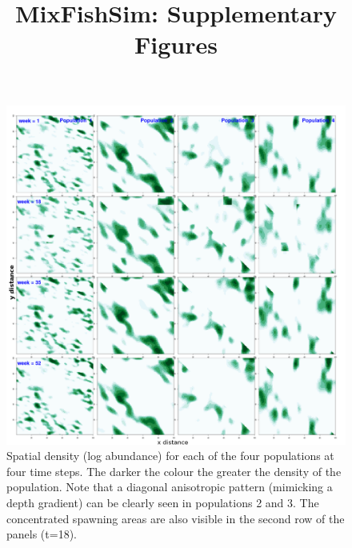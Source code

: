 \documentclass[review]{elsarticle}
\title{MixFishSim: Supplementary Figures}
\newcommand{\beginsupplement}{%
		        \setcounter{table}{0}
		        \renewcommand{\thetable}{S\arabic{table}}%
		        \setcounter{figure}{0}
		        \renewcommand{\thefigure}{S\arabic{figure}}%
			     }
\begin{document}
\beginsupplement
\maketitle

\begin{figure}[!ht]
	\includegraphics[width = \linewidth]{Plots/pop_dist}
	\caption{Spatial density (log abundance) for each of the four
		populations at four time steps. The darker the colour the
		greater the density of the population. Note that a diagonal
		anisotropic pattern (mimicking a depth gradient) can be
		clearly seen in populations 2 and 3. The concentrated spawning
		areas are also visible in the second row of the panels
		(t=18).}
	\label{fig:9}
\end{figure}	
\end{document}
